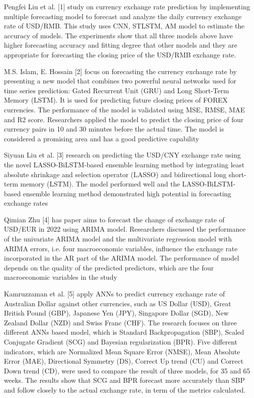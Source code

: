 \documentclass{ieeeojies}
\begin{document}
Pengfei Liu et al. [1] study on currency exchange rate prediction by implementing multiple forecasting model to forecast and analyze the daily currency exchange rate of USD/RMB. This study uses CNN, STLSTM, AM model to estimate the accuracy of models. The experiments show that all three models above have higher forecasting accuracy and fitting degree that other models and they are appropriate for forecasting the closing price of the USD/RMB exchange rate.

M.S. Islam, E. Hossain [2] focus on forecasting the currency exchange rate by presenting a new model that combines two powerful neural networks used for time series prediction: Gated Recurrent Unit (GRU) and Long Short-Term Memory (LSTM). It is used for predicting future closing prices of FOREX currencies. The performance of the model is validated using MSE, RMSE, MAE and R2 score. Researchers applied the model to predict the closing price of four currency pairs in 10 and 30 minutes before the actual time. The model is considered a promising area and has a good predictive capability

Siyuan Liu et al. [3] research on predicting the USD/CNY exchange rate using the novel LASSO-BiLSTM-based ensemble learning method by integrating least absolute shrinkage and selection operator (LASSO) and bidirectional long short-term memory (LSTM). The model performed well and the LASSO-BiLSTM-based ensemble learning method demonstrated high potential in forecasting exchange rates

Qimian Zhu [4] has paper aims to forecast the change of exchange rate of USD/EUR in 2022 using ARIMA model. Researchers discussed the performance of the univariate ARIMA model and the multivariate regression model with ARIMA errors, i.e. four macroeconomic variables, influence the exchange rate incorporated in the AR part of the ARIMA model. The performance of model depends on the quality of the predicted predictors, which are the four macroeconomic variables in the study

Kamruzzaman et al. [5] apply ANNs to predict currency exchange rate of Australian Dollar against other currencies, such as US Dollar (USD), Great British Pound (GBP), Japanese Yen (JPY), Singapore Dollar (SGD), New Zealand Dollar (NZD) and Swiss Franc (CHF). The research focuses on three different ANNs based model, which is Standard Backpropagation (SBP), Scaled Conjugate Gradient (SCG) and Bayesian regularization (BPR). Five different indicators, which are Normalized Mean Square Error (NMSE), Mean Absolute Error (MAE), Directional Symmetry (DS), Correct Up
trend (CU) and Correct Down trend (CD), were used to compare the result of three models, for 35 and 65 weeks. The results show that SCG and BPR forecast more accurately than SBP and follow closely to the actual exchange rate, in term of the metrics calculated.
\end{document}
